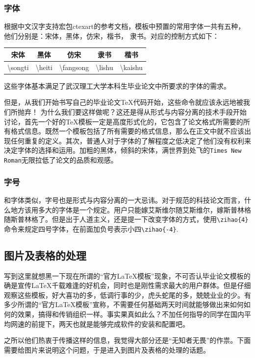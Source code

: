 \subsubsection{字体}
根据中文汉字支持宏包ctexart的参考文档，模板中预置的常用字体一共有五种，他们分别是：宋体，黑体，仿宋，楷书， 隶书。对应的控制方式如下：
\begin{center}
\begin{tabular}{ccccc}
\hline \rule[-2ex]{0pt}{5.5ex} { 宋体} & { 黑体} & { 仿宋} & { 隶书} & {楷书} \\ 
\hline \rule[-2ex]{0pt}{5.5ex} \textbackslash songti &\textbackslash  heiti  & \textbackslash fangsong & \textbackslash lishu & \textbackslash kaishu \\ 
\hline 
\end{tabular}  
\end{center}
这些字体基本满足了武汉理工大学本科生毕业论文中所要求的字体的需求。

但是，从我们开始书写自己的毕业论文\TeX 代码开始，这些命令就应该永远地被我们所抛弃！ 为什么我们要这样做呢？这还是得从形式与内容分离的技术手段开始讨论，首先一个好的\TeX 模板一定是高度形式化的，它包含了论文格式所需要的所有格式信息。既然一个模板包括了所有需要的格式信息，那么在正文中就不应该出现任何重复的定义。其次，普通人对于字体的了解程度之低决定了他们没有权利来决定字体的选择和运用。加粗的黑体，倾斜的宋体，满世界到处飞的\verb|Times New Roman|无限拉低了论文的品质和观感。
\subsubsection{字号}
和字体类似，字号也是形式与内容分离的一大忌讳。对于规范的科技论文而言，什么地方该用多大的字体是一个规定。用户只能嫁艾斯维尔随艾斯维尔，嫁斯普林格随斯普林格了。但是出于人道主义，还是提一下改变字体的方式，使用\verb|\zihao{4}|命令来规定四号字体，在前面加负号表示小四\verb|\zihao{-4}|.
\subsection{图片及表格的处理}
写到这里就想黑一下现在所谓的“官方\LaTeX 模板”现象，不可否认毕业论文模板的确是宣传\LaTeX 千载难逢的好机会，同时也是刚性需求最大的用户群体。但是仔细观察这些模板，好大喜功的多，低调行事的少，虎头蛇尾的多，兢兢业业的少。有多少所谓的“官方\LaTeX 模板”宣称，不需要任何基础两天时间就能够做出来如何如何的效果，搞得和传销组织一样。事实果真如此么？不加任何指导的同学在国内平均网速的前提下，两天也就是能够完成软件的安装和配置吧。

之所以他们热衷于传播这样的信息，我觉得大部分还是“无知者无畏”的作祟。下面需要给图片来说明这个问题，于是进入到图片及表格的处理的话题。
